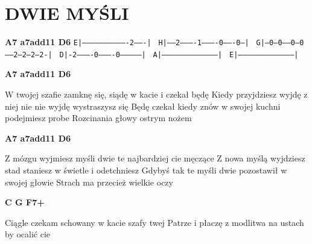 \documentclass[../../../songbook.tex]{subfiles}
\begin{document}
\TabPositions{8cm} %
\section*{DWIE MYŚLI}
{}
\vspace{0.5cm}
{\color{red}\textbf{A7  a7add11  D6} } \newline               
 \texttt{E|-------------------------------2-------| }	\newline  
 \texttt{H|-----2----------1----------0-------0---| }	\newline  
 \texttt{G|---0---0------0---0------2---2---2---2-| }	\newline  
 \texttt{D|-2----------0----------0---------------| }	\newline
 \texttt{A|---------------------------------------| }	\newline
 \texttt{E|---------------------------------------| }	\newline

{\color{red}\textbf{A7  a7add11  D6} } \newline

   
W twojej szafie zamknę się, siądę w kacie i czekał będę		\quad {} \newline
Kiedy przyjdziesz wyjdę z niej nie nie wyjdę wystraszysz się \newline
Będę czekał kiedy znów w swojej kuchni podejmiesz probe \newline
Rozcinania głowy ostrym nożem \newline

{\color{red}\textbf{A7  a7add11  D6} } \newline

Z mózgu wyjmiesz myśli dwie te najbardziej cie męczące \newline
Z nowa myślą wyjdziesz stad staniesz w świetle i odetchniesz \newline
Gdybyś tak te myśli dwie pozostawił w swojej głowie \newline
Strach ma przecież wielkie oczy \newline

{\color{red}\textbf{C G F7+} } \newline

\-\hspace{1cm} Ciągle czekam schowany w kacie szafy twej			\quad \quad\quad {} \newline
\-\hspace{1cm} Patrze i płaczę z modlitwa na ustach by ocalić cie	\quad {} \newline
\end{document}
